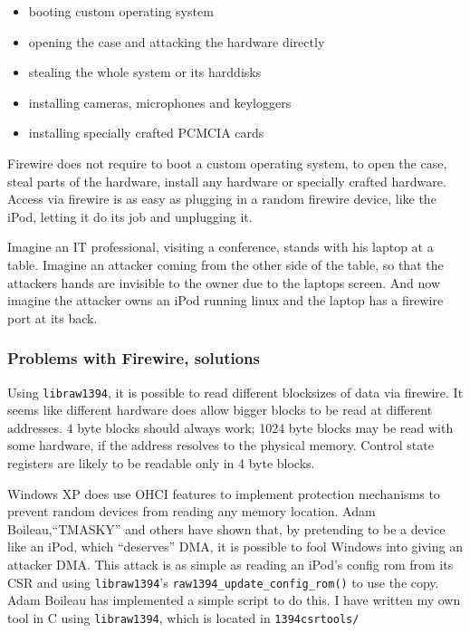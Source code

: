 \begin{itemize}

	\item booting custom operating system

	\item opening the case and attacking the hardware directly

	\item stealing the whole system or its harddisks

	\item installing cameras, microphones and keyloggers

	\item installing specially crafted PCMCIA cards

\end{itemize}

Firewire does not require to boot a custom operating system, to open the case,
steal parts of the hardware, install any hardware or specially crafted hardware.
Access via firewire is as easy as plugging in a random firewire device, like the
iPod, letting it do its job and unplugging it.

Imagine an IT professional, visiting a conference, stands with his laptop at a
table.  Imagine an attacker coming from the other side of the table, so that the
attackers hands are invisible to the owner due to the laptops screen. And now
imagine the attacker owns an iPod running linux and the laptop has a firewire
port at its back.



\subsubsection{Problems with Firewire, solutions}

Using \texttt{libraw1394}, it is possible to read different blocksizes of data
via firewire.  It seems like different hardware does allow bigger blocks to be
read at different addresses. 4 byte blocks should always work; 1024 byte blocks
may be read with some hardware, if the address resolves to the physical memory.
Control state registers are likely to be readable only in 4 byte blocks.

\label{windows-dma} Windows XP does use OHCI features to implement protection
mechanisms to prevent random devices from reading any memory location.  Adam
Boileau,``TMASKY'' and others have shown \cite{rux2k6firewire:2006} that, by
pretending to be a device like an iPod, which ``deserves'' DMA, it is possible
to fool Windows into giving an attacker DMA.  This attack is as simple as
reading an iPod's config rom from its CSR and using \texttt{libraw1394}'s
\texttt{raw1394\_update\_config\_rom()} to use the copy.  Adam Boileau has
implemented a simple script to do this. I have written my own tool in C using
\texttt{libraw1394}, which is located in \texttt{1394csrtools/}



